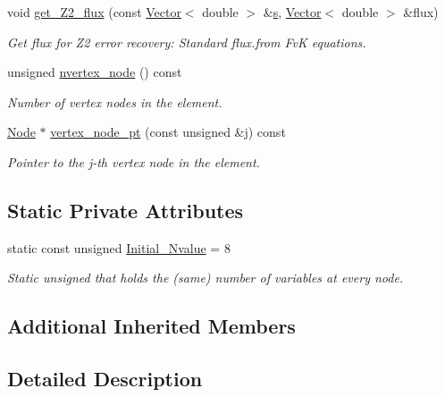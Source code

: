 \begin{DoxyCompactItemize}
void \hyperlink{classoomph_1_1TFoepplvonKarmanElement_abb5ccf3f6067b81ddecd73c352534ef9}{get\+\_\+\+Z2\+\_\+flux} (const \hyperlink{classoomph_1_1Vector}{Vector}$<$ double $>$ \&\hyperlink{cfortran_8h_ab7123126e4885ef647dd9c6e3807a21c}{s}, \hyperlink{classoomph_1_1Vector}{Vector}$<$ double $>$ \&flux)
\begin{DoxyCompactList}\small\item\em Get \textquotesingle{}flux\textquotesingle{} for Z2 error recovery\+: Standard flux.\+from FvK equations. \end{DoxyCompactList}\item 
unsigned \hyperlink{classoomph_1_1TFoepplvonKarmanElement_aee9854af71ebdca47e675ee73dc589e4}{nvertex\+\_\+node} () const
\begin{DoxyCompactList}\small\item\em Number of vertex nodes in the element. \end{DoxyCompactList}\item 
\hyperlink{classoomph_1_1Node}{Node} $\ast$ \hyperlink{classoomph_1_1TFoepplvonKarmanElement_a2b88b4d2198e38dde6debed69dceb004}{vertex\+\_\+node\+\_\+pt} (const unsigned \&j) const
\begin{DoxyCompactList}\small\item\em Pointer to the j-\/th vertex node in the element. \end{DoxyCompactList}\end{DoxyCompactItemize}
\subsection*{Static Private Attributes}
\begin{DoxyCompactItemize}
\item 
static const unsigned \hyperlink{classoomph_1_1TFoepplvonKarmanElement_a2871fb75e641c5b5e77d9570b32ff181}{Initial\+\_\+\+Nvalue} = 8
\begin{DoxyCompactList}\small\item\em Static unsigned that holds the (same) number of variables at every node. \end{DoxyCompactList}\end{DoxyCompactItemize}
\subsection*{Additional Inherited Members}


\subsection{Detailed Description}
